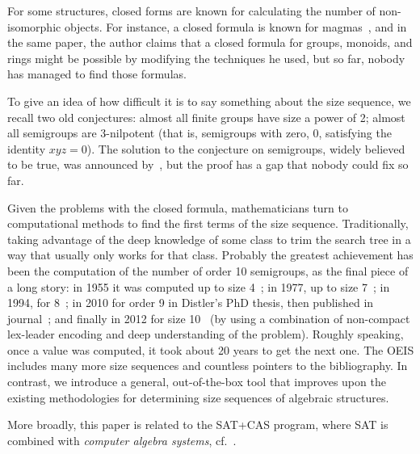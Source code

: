 For some structures, closed forms are known for calculating the number
of non-isomorphic objects.  For instance, a closed formula is known for
magmas~\cite{harrison1966}, and in the same paper, the author claims that a
closed formula for groups, monoids, and rings might be possible by modifying
the techniques he used, but so far, nobody has managed to find those formulas.
%

To give an idea of how difficult it is to say something about the size
sequence, we recall two old conjectures: almost all finite groups have size a
power of 2; almost all semigroups are 3-nilpotent (that is, semigroups with
zero, $0$, satisfying the identity $xyz=0$). The solution to the conjecture on
semigroups, widely believed to be true, was announced by~\citet{kleitman1976},
but the proof has a gap that nobody could fix so far.

Given the problems with the closed formula, mathematicians turn to
computational methods to find the first terms of the size sequence.
Traditionally, taking advantage of the deep knowledge of some class to trim the
search tree in a way that usually only works for that class.  Probably the
greatest achievement has been the computation of the number of order 10
semigroups, as the final piece of a long story: in 1955 it was computed up to
size 4~\cite{semigroups4}; in 1977, up to size 7~\cite{juergensen1977}; in
1994, for 8~\cite{satoh1994}; in 2010 for order 9 in Distler's PhD thesis, then
published in journal~\cite{distler2014}; and finally in 2012 for size
10~\cite{distler2012} (by using a combination of non-compact lex-leader
encoding and deep understanding of the problem). Roughly speaking, once a value
was computed, it took about 20 years to get the next one. The OEIS includes
many more size sequences and countless pointers to the bibliography. In
contrast, we introduce a general, out-of-the-box tool that improves upon the
existing methodologies for determining size sequences of algebraic structures.

More broadly, this paper is related to the SAT+CAS program, where SAT is
combined with \emph{computer algebra systems},
cf.~\citet{Williamson,bright-cacm22}.

